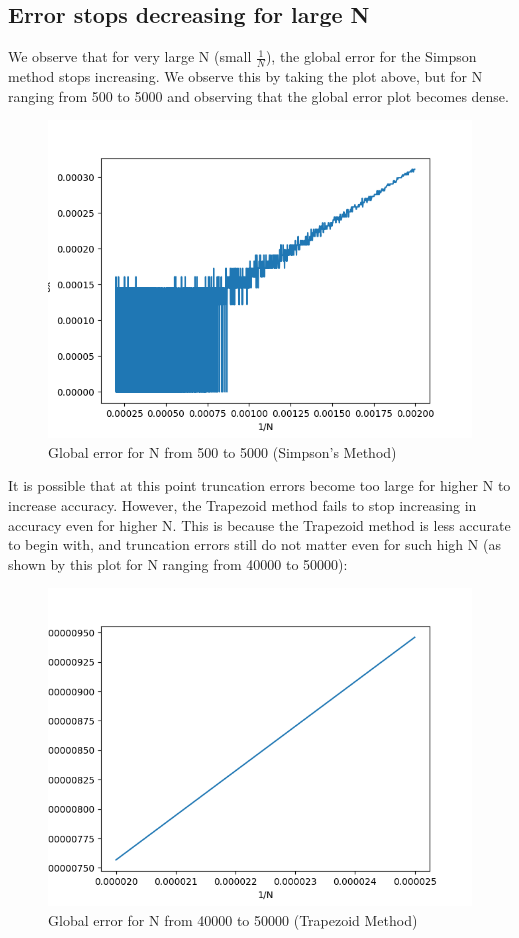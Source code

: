 \documentclass[11pt]{article}
\begin{document}
\subsection{Error stops decreasing for large N}
We observe that for very large N (small $\frac{1}{N}$), the global error for the Simpson method stops increasing. We observe this by taking the plot above, but for N ranging from 500 to 5000 and observing that the global error plot becomes dense.
\begin{figure}[htp]
\centering
\includegraphics[scale=0.80]{simp_err_500_5000.png}
\caption{Global error for N from 500 to 5000 (Simpson's Method)}
\label{simp_dense}
\end{figure}
It is possible that at this point truncation errors become too large for higher N to increase accuracy. However, the Trapezoid method fails to stop increasing in accuracy even for higher N. This is because the Trapezoid method is less accurate to begin with, and truncation errors still do not matter even for such high N (as shown by this plot for N ranging from 40000 to 50000):
\newpage

\begin{figure}[htp]
\centering
\includegraphics[scale=0.80]{trap_err_40000_50000.png}
\caption{Global error for N from 40000 to 50000 (Trapezoid Method)}
\label{trap_no_break}
\end{figure}
\end{document}

